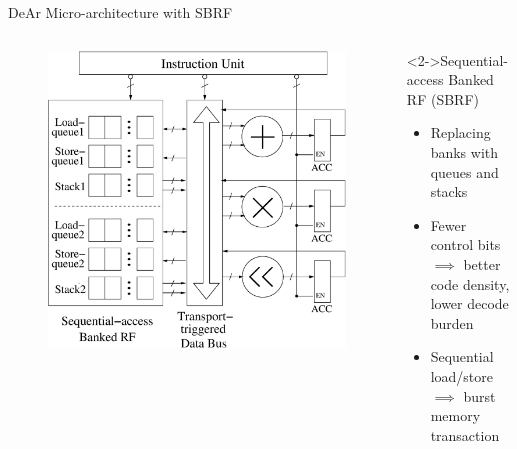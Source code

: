 \documentclass{beamer}
\begin{document}
\begin{CJK}{UTF8}{bkai}
            \begin{frame}{DeAr Micro-architecture with SBRF}
                \begin{columns}
                    \begin{column}{0.6\textwidth}
                        \begin{figure}[!ht] 
                            \centering
                            \includegraphics[width=1.0\textwidth]{./figs/micro.eps}
                        \end{figure}
                    \end{column}
                    \begin{column}{0.35\textwidth}
                        \begin{block}<2->{Sequential-access Banked RF (SBRF)}
                            \begin{itemize}
                                \item <3->{Replacing banks with queues and stacks}
                                \item <4->{Fewer control bits\\
                                    $\implies$ better code density, lower decode burden}
                                \item <5->{Sequential load/store \\
                                    $\implies$ burst memory transaction}
                            \end{itemize}    
                        \end{block}
                    \end{column}
                \end{columns}
            \end{frame}


\end{CJK}
\end{document}
